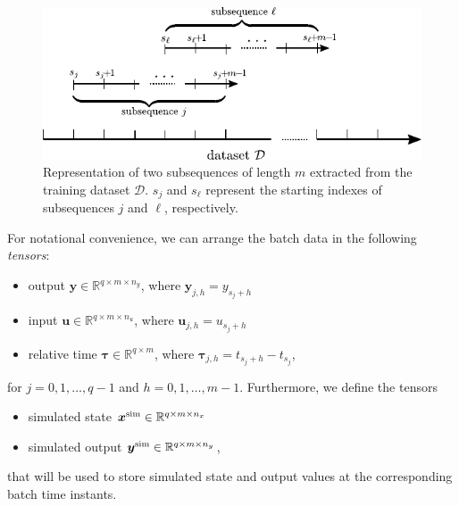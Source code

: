 \documentclass{article} %
\newcommand{\batchsize}{q}
\newcommand{\seqlen}{m}
\newcommand{\tens}[1]{\bm{#1}}
\newcommand{\simul}[1]{{#1}^{\rm sim}}
\newcommand{\est}{}
\begin{document}
\begin{figure}
\centering
\includegraphics[width=.9\textwidth]{fig/scheme/subsequences.pdf}
\caption{Representation of two subsequences of length $m$ extracted from the training dataset  $\mathcal{D}$.  $s_j$ and $s_\ell$ represent the starting indexes of subsequences $j$ and $\ell$, respectively. }
\label{fig:subsequences}
\end{figure}
For notational convenience, we can arrange the batch data in the following \emph{tensors}:
\begin{itemize}
 \item output $\tens{y} \in \mathbb{R}^{\batchsize \times \seqlen \times n_y}$, where $\tens{y}_{j,h} = {y_{s_j+h}}$
 \item input $\tens{u} \in \mathbb{R}^{\batchsize \times \seqlen \times n_u}$, where $\tens{u}_{j,h}
 = {u_{s_j+h}}$
\item relative time $\tens{\tau} \in \mathbb{R}^{\batchsize \times \seqlen}$, where $\tens{\tau}_{j,h} = {t_{s_j+h} - t_{s_j}}$,
\end{itemize}
for $j=0,1,\dots,\batchsize-1$ and $h=0,1,\dots, \seqlen-1$. Furthermore, we define the tensors
\begin{itemize}
  \item  simulated  state $\simul{\tens{x}} \in \mathbb{R}^{\batchsize \times \seqlen \times n_x}$%
\item simulated output $\simul{\est{{\tens{y}}}} \in \mathbb{R}^{\batchsize \times \seqlen \times n_y}$,%
\end{itemize}
that will be used to store simulated state and output values at the corresponding batch time instants.
\end{document}
